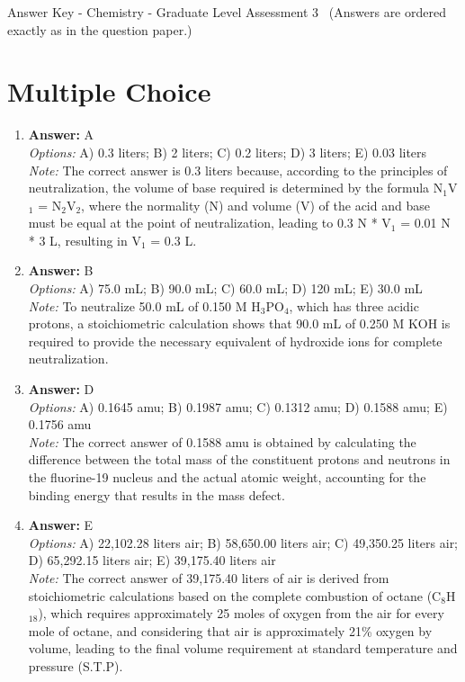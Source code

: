 \documentclass[12pt]{article}
\begin{document}
\begin{center}
Answer Key - Chemistry - Graduate Level Assessment 3 \
\small (Answers are ordered exactly as in the question paper.)
\end{center}

\section*{Multiple Choice}
\begin{enumerate}[label=\arabic*.]
\item \textbf{Answer:} A
\\ \textit{Options:} A) 0.3 liters; B) 2 liters; C) 0.2 liters; D) 3 liters; E) 0.03 liters
\\ \textit{Note:} The correct answer is 0.3 liters because, according to the principles of neutralization, the volume of base required is determined by the formula N$_{1}$V$_{1}$ = N$_{2}$V$_{2}$, where the normality (N) and volume (V) of the acid and base must be equal at the point of neutralization, leading to 0.3 N * V$_{1}$ = 0.01 N * 3 L, resulting in V$_{1}$ = 0.3 L.
\item \textbf{Answer:} B
\\ \textit{Options:} A) 75.0 mL; B) 90.0 mL; C) 60.0 mL; D) 120 mL; E) 30.0 mL
\\ \textit{Note:} To neutralize 50.0 mL of 0.150 M H$_{3}$PO$_{4}$, which has three acidic protons, a stoichiometric calculation shows that 90.0 mL of 0.250 M KOH is required to provide the necessary equivalent of hydroxide ions for complete neutralization.
\item \textbf{Answer:} D
\\ \textit{Options:} A) 0.1645 amu; B) 0.1987 amu; C) 0.1312 amu; D) 0.1588 amu; E) 0.1756 amu
\\ \textit{Note:} The correct answer of 0.1588 amu is obtained by calculating the difference between the total mass of the constituent protons and neutrons in the fluorine-19 nucleus and the actual atomic weight, accounting for the binding energy that results in the mass defect.
\item \textbf{Answer:} E
\\ \textit{Options:} A) 22,102.28 liters air; B) 58,650.00 liters air; C) 49,350.25 liters air; D) 65,292.15 liters air; E) 39,175.40 liters air
\\ \textit{Note:} The correct answer of 39,175.40 liters of air is derived from stoichiometric calculations based on the complete combustion of octane (C$_{8}$H$_{18}$), which requires approximately 25 moles of oxygen from the air for every mole of octane, and considering that air is approximately 21\% oxygen by volume, leading to the final volume requirement at standard temperature and pressure (S.T.P).

\end{enumerate}
\end{document}
